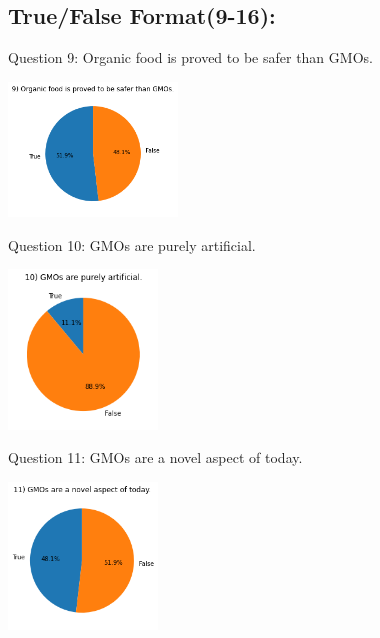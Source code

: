 \documentclass[11pt]{article}
\begin{document}
    \newpage
    \subsection{True/False Format(9-16):}
    \item{Question 9: Organic food is proved to be safer than GMOs.}
    \begin{center}
        \includegraphics[width=170]{ChanR EDA/q9}
    \end{center}

    \item{Question 10: GMOs are purely artificial.}
    \begin{center}
        \includegraphics[width=150]{ChanR EDA/q10}
    \end{center}

    \newpage
    \item{Question 11: GMOs are a novel aspect of today.}
    \begin{center}
        \includegraphics[width=150]{ChanR EDA/q11}
    \end{center}
\end{document}
